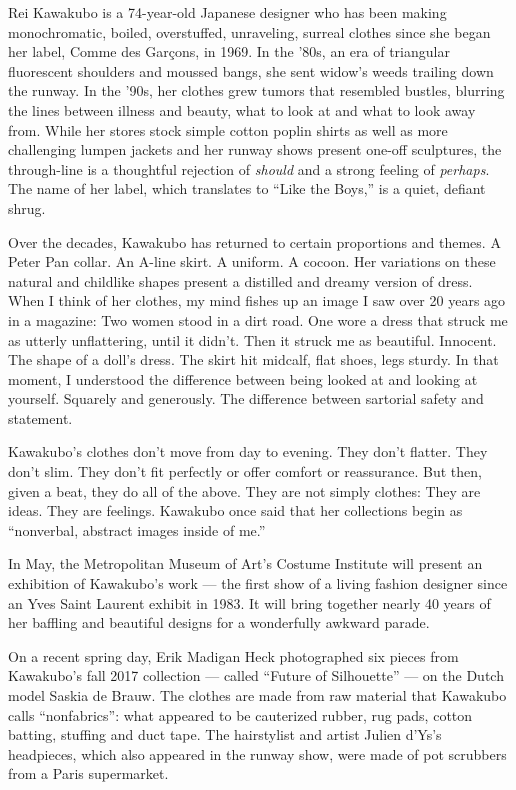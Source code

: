 Rei Kawakubo is a 74-year-old Japanese designer who has been making
monochromatic, boiled, overstuffed, unraveling, surreal clothes since
she began her label, Comme des Garçons, in 1969. In the '80s, an era of
triangular fluorescent shoulders and moussed bangs, she sent widow's
weeds trailing down the runway. In the '90s, her clothes grew tumors
that resembled bustles, blurring the lines between illness and beauty,
what to look at and what to look away from. While her stores stock
simple cotton poplin shirts as well as more challenging lumpen jackets
and her runway shows present one-off sculptures, the through-line is a
thoughtful rejection of \emph{should} and a strong feeling of
\emph{perhaps}. The name of her label, which translates to ``Like the
Boys,'' is a quiet, defiant shrug.

Over the decades, Kawakubo has returned to certain proportions and
themes. A Peter Pan collar. An A-line skirt. A uniform. A cocoon. Her
variations on these natural and childlike shapes present a distilled and
dreamy version of dress. When I think of her clothes, my mind fishes up
an image I saw over 20 years ago in a magazine: Two women stood in a
dirt road. One wore a dress that struck me as utterly unflattering,
until it didn't. Then it struck me as beautiful. Innocent. The shape of
a doll's dress. The skirt hit midcalf, flat shoes, legs sturdy. In that
moment, I understood the difference between being looked at and looking
at yourself. Squarely and generously. The difference between sartorial
safety and statement.

Kawakubo's clothes don't move from day to evening. They don't flatter.
They don't slim. They don't fit perfectly or offer comfort or
reassurance. But then, given a beat, they do all of the above. They are
not simply clothes: They are ideas. They are feelings. Kawakubo once
said that her collections begin as ``nonverbal, abstract images inside
of me.''

In May, the Metropolitan Museum of Art's Costume Institute will present
an exhibition of Kawakubo's work --- the first show of a living fashion
designer since an Yves Saint Laurent exhibit in 1983. It will bring
together nearly 40 years of her baffling and beautiful designs for a
wonderfully awkward parade.

On a recent spring day, Erik Madigan Heck photographed six pieces from
Kawakubo's fall 2017 collection --- called ``Future of Silhouette'' ---
on the Dutch model Saskia de Brauw. The clothes are made from raw
material that Kawakubo calls ``nonfabrics'': what appeared to be
cauterized rubber, rug pads, cotton batting, stuffing and duct tape. The
hairstylist and artist Julien d'Ys's headpieces, which also appeared in
the runway show, were made of pot scrubbers from a Paris supermarket.

